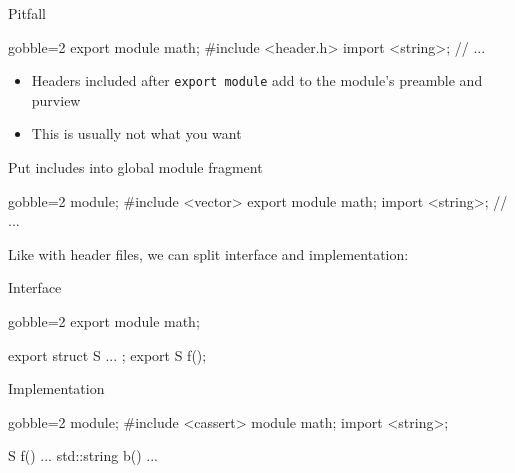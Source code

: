 \begin{frame}[fragile]
  \begin{alertblock}{Pitfall}
    \begin{cppcode*}{gobble=2}
      export module math;
      #include <header.h>
      import <string>;
      // ...
    \end{cppcode*}
  \end{alertblock}
  \begin{block}{}
    \begin{itemize}
    \item Headers included after \texttt{export module} add to the module's preamble and purview
    \item This is usually not what you want
    \end{itemize}
  \end{block}
  \begin{exampleblock}{Put includes into global module fragment}
    \begin{cppcode*}{gobble=2}
      module;
      #include <vector>
      export module math;
      import <string>;
      // ...
    \end{cppcode*}
  \end{exampleblock}
\end{frame}

\begin{frame}[fragile,shrink=5]
  \begin{block}{}
    Like with header files, we can split interface and implementation:
  \end{block}
  \begin{exampleblock}{Interface}
    \begin{cppcode*}{gobble=2}
      export module math;

      export struct S { ... };
      export S f();
    \end{cppcode*}
  \end{exampleblock}
  \begin{exampleblock}{Implementation}
    \begin{cppcode*}{gobble=2}
      module;
      #include <cassert>
      module math;
      import <string>;

      S f() { ... }
      std::string b() { ... }
    \end{cppcode*}
  \end{exampleblock}
\end{frame}

